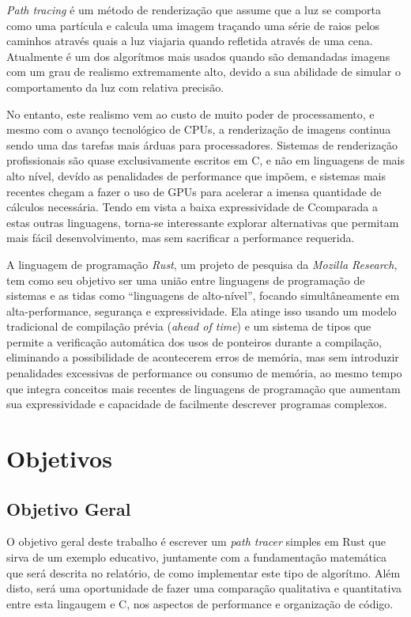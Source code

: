 \documentclass[12pt]{article}
\def\Cpp{{C\nolinebreak[4]\raisebox{.20ex}{\small\bf++}}}
\begin{document}
\emph{Path tracing} é um método de renderização que assume que a luz se comporta como uma partícula e calcula uma imagem traçando uma série de raios pelos caminhos através quais a luz viajaria quando refletida através de uma cena. Atualmente é um dos algorítmos mais usados quando são demandadas imagens com um grau de realismo extremamente alto, devido a sua abilidade de simular o comportamento da luz com relativa precisão.

No entanto, este realismo vem ao custo de muito poder de processamento, e mesmo com o avanço tecnológico de CPUs, a renderização de imagens continua sendo uma das tarefas mais árduas para processadores. Sistemas de renderização profissionais são quase exclusivamente escritos em \Cpp, e não em linguagens de mais alto nível, devído as penalidades de performance que impõem, e sistemas mais recentes chegam a fazer o uso de GPUs para acelerar a imensa quantidade de cálculos necessária. Tendo em vista a baixa expressividade de \Cpp comparada a estas outras linguagens, torna-se interessante explorar alternativas que permitam mais fácil desenvolvimento, mas sem sacrificar a performance requerida.

A linguagem de programação \emph{Rust}, um projeto de pesquisa da \emph{Mozilla Research}, tem como seu objetivo ser uma união entre linguagens de programação de sistemas e as tidas como ``linguagens de alto-nível'', focando simultâneamente em alta-performance, segurança e expressividade. Ela atinge isso usando um modelo tradicional de compilação prévia (\emph{ahead of time}) e um sistema de tipos que permite a verificação automática dos usos de ponteiros durante a compilação, eliminando a possibilidade de acontecerem erros de memória, mas sem introduzir penalidades excessivas de performance ou consumo de memória, ao mesmo tempo que integra conceitos mais recentes de linguagens de programação que aumentam sua expressividade e capacidade de facilmente descrever programas complexos.

\section{Objetivos}

\subsection{Objetivo Geral}

O objetivo geral deste trabalho é escrever um \emph{path tracer} simples em Rust que sirva de um exemplo educativo, juntamente com a fundamentação matemática que será descrita no relatório, de como implementar este tipo de algorítmo. Além disto, será uma oportunidade de fazer uma comparação qualitativa e quantitativa entre esta lingaugem e \Cpp, nos aspectos de performance e organização de código.
\end{document}
